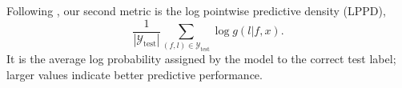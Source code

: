 Following \citep{kuntz2023particle}, our second metric is the log pointwise predictive density (LPPD),
\begin{equation*}
\frac{1}{|\mathcal{Y}_\text{test}|}\sum_{(f,l)\in\mathcal{Y}_\text{test}} \log g(l|f,x).
\end{equation*}
It is the average log probability assigned by the model to the correct test label; larger values indicate better predictive performance.
